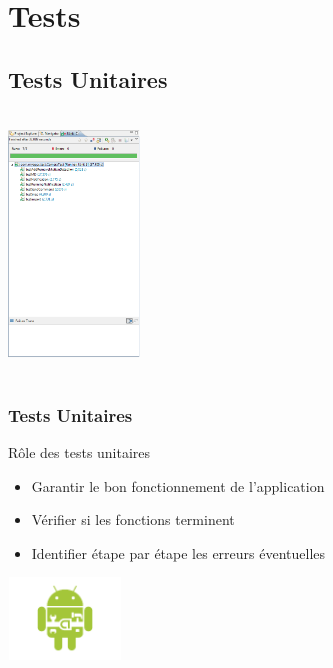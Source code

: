 \section{Tests}
\subsection{Tests Unitaires}
  \begin{frame}
\begin{minipage}{0.32\textwidth}
\includegraphics[width=3.5cm, height=7cm]{Images/ImageSlide12a.png}
\end{minipage}
\begin{minipage}{0.49\textwidth}
\frametitle{Tests Unitaires}
Rôle des tests unitaires
  \begin{itemize}
 \item Garantir le bon fonctionnement de l'application
    \item Vérifier si les fonctions terminent
    \item Identifier étape par étape les erreurs éventuelles
\end{itemize} 
\end{minipage}
\begin{minipage}{0.10\textwidth}
 \includegraphics[width=3cm, height=2.2cm]{Images/ImageSlide12.png}
\end{minipage}
\end{frame}